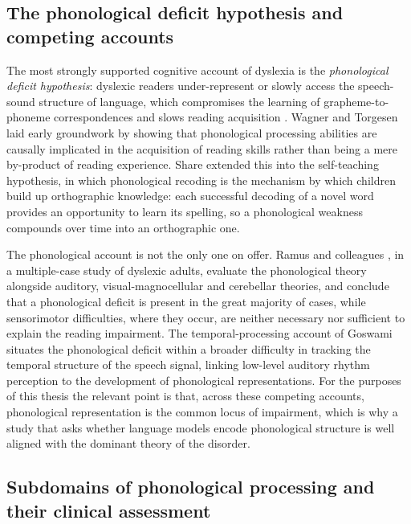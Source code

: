 \subsection{The phonological deficit hypothesis and competing accounts}

The most strongly supported cognitive account of dyslexia is the \emph{phonological deficit hypothesis}: dyslexic readers under-represent or slowly access the speech-sound structure of language, which compromises the learning of grapheme-to-phoneme correspondences and slows reading acquisition \cite{snowling2020dyslexia,goswami2011temporal,wagner1987nature}. Wagner and Torgesen \cite{wagner1987nature} laid early groundwork by showing that phonological processing abilities are causally implicated in the acquisition of reading skills rather than being a mere by-product of reading experience. Share \cite{share1995phonological} extended this into the self-teaching hypothesis, in which phonological recoding is the mechanism by which children build up orthographic knowledge: each successful decoding of a novel word provides an opportunity to learn its spelling, so a phonological weakness compounds over time into an orthographic one.

The phonological account is not the only one on offer. Ramus and colleagues \cite{ramus2003theories}, in a multiple-case study of dyslexic adults, evaluate the phonological theory alongside auditory, visual-magnocellular and cerebellar theories, and conclude that a phonological deficit is present in the great majority of cases, while sensorimotor difficulties, where they occur, are neither necessary nor sufficient to explain the reading impairment. The temporal-processing account of Goswami \cite{goswami2011temporal} situates the phonological deficit within a broader difficulty in tracking the temporal structure of the speech signal, linking low-level auditory rhythm perception to the development of phonological representations. For the purposes of this thesis the relevant point is that, across these competing accounts, phonological representation is the common locus of impairment, which is why a study that asks whether language models encode phonological structure is well aligned with the dominant theory of the disorder.

\subsection{Subdomains of phonological processing and their clinical assessment}

